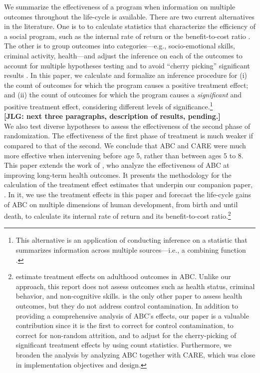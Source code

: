 \noindent We summarize the effectiveness of a program when information on multiple outcomes throughout the life-cycle is available. There are two current alternatives in the literature. One is to to calculate statistics that characterize the efficiency of a social program, such as the internal rate of return or the benefit-to-cost ratio \citep{Heckman_Moon_etal_2010_RateofReturn}. The other is to group outcomes into categories---e.g., socio-emotional skills, criminal activity, health---and adjust the inference on each of the outcomes to account for multiple hypotheses testing and to avoid ``cherry picking'' significant results \citep{Lehman_Romano_2005_AnnStat,Lehmann_Romano_2005_testing,Heckman_Moon_etal_2010_QE}. In this paper, we calculate and formalize an inference procedure for (i) the count of outcomes for which the program causes a positive treatment effect; and (ii) the count of outcomes for which the program causes a \emph{significant} and positive treatment effect, considering different levels of significance.\footnote{This alternative is an application of conducting inference on a statistic that summarizes information across multiple sources---i.e., a combining function \citep{Pesarin_Salmaso_2010_PermutationTests}.}\\

\noindent \textbf{[JLG: next three paragraphs, description of results, pending.]}\\

\noindent We also test diverse hypotheses to assess the effectiveness of the second phase of randomization. The effectiveness of the first phase of treatment is much weaker if compared to that of the second. We conclude that ABC and CARE were much more effective when intervening before age 5, rather than between ages 5 to 8.\\

\noindent This paper extends the work of \citet{Campbell_Conti_etal_2014_EarlyChildhoodInvestments}, who analyze the effectiveness of ABC at improving long-term health outcomes. It presents the methodology for the calculation of the treatment effect estimates that underpin our companion paper, \citet{Elango_et_al_2015_ABC_unpublished}. In it, we use the treatment effects in this paper and forecast the life-cycle gains of ABC on multiple dimensions of human development, from birth and until death, to calculate its internal rate of return and its benefit-to-cost ratio.\footnote{\cite{Campbell_Pungello_etal_2012_DP} estimate treatment effects on adulthood outcomes in ABC. Unlike our approach, this report does not assess outcomes such as health status, criminal behavior, and non-cognitive skills. \cite{Campbell_Conti_etal_2014_EarlyChildhoodInvestments} is the only other paper to assess health outcomes, but they do not address control contamination. In addition to providing a comprehensive analysis of ABC's effects, our paper is a valuable contribution since it is the first to correct for control contamination, to correct for non-random attrition, and to adjust for the cherry-picking of significant treatment effects by using count statistics. Furthermore, we broaden the analysis by analyzing ABC together with CARE, which was close in implementation objectives and design.}\\

